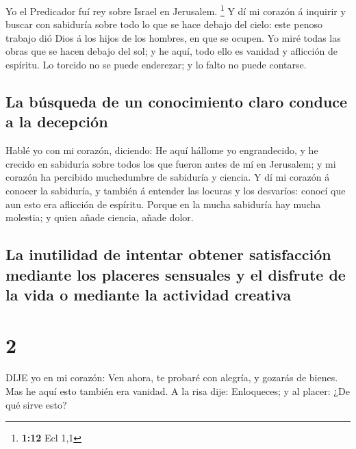  Yo el Predicador fuí rey sobre Israel en Jerusalem.
\footnote{\textbf{1:12} Ecl 1,1}  Y dí mi corazón á
inquirir y buscar con sabiduría sobre todo lo que se hace debajo del
cielo: este penoso trabajo dió Dios á los hijos de los hombres, en que
se ocupen.  Yo miré todas las obras que se hacen debajo del
sol; y he aquí, todo ello es vanidad y aflicción de espíritu.
 Lo torcido no se puede enderezar; y lo falto no puede
contarse.

\hypertarget{la-buxfasqueda-de-un-conocimiento-claro-conduce-a-la-decepciuxf3n}{%
\subsection{La búsqueda de un conocimiento claro conduce a la
decepción}\label{la-buxfasqueda-de-un-conocimiento-claro-conduce-a-la-decepciuxf3n}}

 Hablé yo con mi corazón, diciendo: He aquí hállome yo
engrandecido, y he crecido en sabiduría sobre todos los que fueron antes
de mí en Jerusalem; y mi corazón ha percibido muchedumbre de sabiduría y
ciencia.  Y dí mi corazón á conocer la sabiduría, y también
á entender las locuras y los desvaríos: conocí que aun esto era
aflicción de espíritu.  Porque en la mucha sabiduría hay
mucha molestia; y quien añade ciencia, añade dolor.

\hypertarget{la-inutilidad-de-intentar-obtener-satisfacciuxf3n-mediante-los-placeres-sensuales-y-el-disfrute-de-la-vida-o-mediante-la-actividad-creativa}{%
\subsection{La inutilidad de intentar obtener satisfacción mediante los
placeres sensuales y el disfrute de la vida o mediante la actividad
creativa}\label{la-inutilidad-de-intentar-obtener-satisfacciuxf3n-mediante-los-placeres-sensuales-y-el-disfrute-de-la-vida-o-mediante-la-actividad-creativa}}

\hypertarget{section-1}{%
\section{2}\label{section-1}}

 DIJE yo en mi corazón: Ven ahora, te probaré con alegría, y
gozarás de bienes. Mas he aquí esto también era vanidad.  A
la risa dije: Enloqueces; y al placer: ¿De qué sirve esto?

